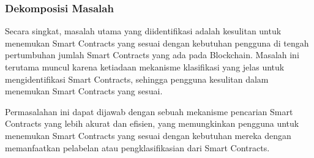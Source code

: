 \subsubsection{Dekomposisi Masalah}
\label{subsubsec:dekomposisi-masalah}


Secara singkat, masalah utama yang diidentifikasi adalah kesulitan untuk menemukan Smart Contracts yang sesuai dengan kebutuhan pengguna di tengah pertumbuhan jumlah Smart Contracts yang ada pada Blockchain. Masalah ini terutama muncul karena ketiadaan mekanisme klasifikasi yang jelas untuk mengidentifikasi Smart Contracts, sehingga pengguna kesulitan dalam menemukan Smart Contracts yang sesuai. 

Permasalahan ini dapat dijawab dengan sebuah mekanisme pencarian Smart Contracts yang lebih akurat dan efisien, yang memungkinkan pengguna untuk menemukan Smart Contracts yang sesuai dengan kebutuhan mereka dengan memanfaatkan pelabelan atau pengklasifikasian dari Smart Contracts.


